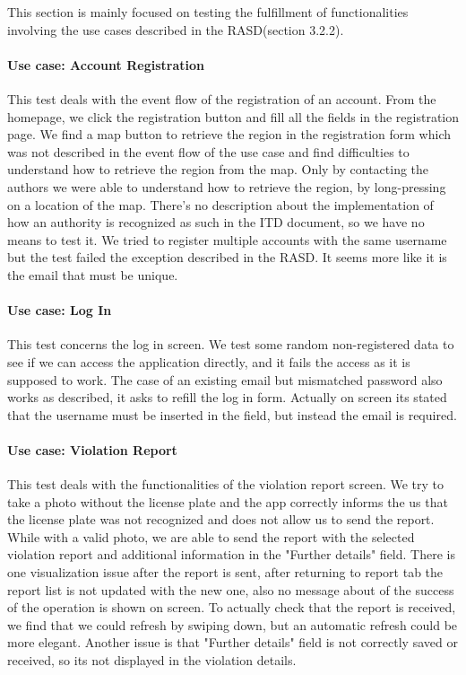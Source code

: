 This section is mainly focused on testing the fulfillment of functionalities involving the use cases described in the RASD(section 3.2.2).
\paragraph{Use case: Account Registration}
This test deals with the event flow of the registration of an account. From the homepage, we click the registration button and fill all the fields in the registration page. We find a map button to retrieve the region in the registration form which was not described in the event flow of the use case and find difficulties to understand how to retrieve the region from the map. Only by contacting the authors we were able to understand how to retrieve the region, by long-pressing on a location of the map. There's no description about the implementation of how an authority is recognized as such in the ITD document, so we have no means to test it. We tried to register multiple accounts with the same username but the test failed the exception described in the RASD. It seems more like it is the email that must be unique.
\paragraph{Use case: Log In} 
This test concerns the log in screen. We test some random non-registered data to see if we can access the application directly, and it fails the access as it is supposed to work. The case of an existing email but mismatched password also works as described, it asks to refill the log in form. Actually on screen its stated that the username must be inserted in the field, but instead the email is required.
\paragraph{Use case: Violation Report} 
This test deals with the functionalities of the violation report screen. We try to take a photo without the license plate and the app correctly informs the us that the license plate was not recognized and does not allow us to send the report. While with a valid photo, we are able to send the report with the selected violation report and additional information in the "Further details" field. There is one visualization issue after the report is sent, after returning to report tab the report list is not updated with the new one, also no message about of the success of the operation is shown on screen. To actually check that the report is received, we find that we could refresh by swiping down, but an automatic refresh could be more elegant. Another issue is that "Further details" field is not correctly saved or received, so its not displayed in the violation details.
